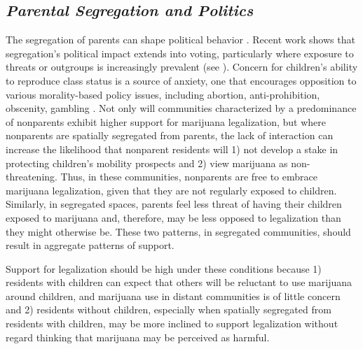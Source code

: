 
\subsection{\it{Parental Segregation and Politics}}

The segregation of parents can shape political behavior \citep{beisel_1997}. Recent work shows that segregation's political impact extends into voting, particularly where exposure to threats or outgroups is increasingly prevalent (see \citealt{andrews_and_seguin_2015}). Concern for children's ability to reproduce class status is a source of anxiety, one that encourages opposition to various morality-based policy issues, including abortion, anti-prohibition, obscenity, gambling \citep{owens_2016,schnabel_and_sevell_2017,luker_1984,gusfield_1963,beisel_1997}. Not only will communities characterized by a predominance of nonparents exhibit higher support for marijuana legalization, but where nonparents are spatially segregated from parents, the lack of interaction can increase the likelihood that nonparent residents will 1) not develop a stake in protecting children's mobility prospects and 2) view marijuana as non-threatening. Thus, in these communities, nonparents are free to embrace marijuana legalization, given that they are not regularly exposed to children. Similarly, in segregated spaces, parents feel less threat of having their children exposed to marijuana and, therefore, may be less opposed to legalization than they might otherwise be. These two patterns, in segregated communities, should result in aggregate patterns of support.





Support for legalization should be high under these conditions because 1) residents with children can expect that others will be reluctant to use marijuana around children, and marijuana use in distant communities is of little concern and 2) residents without children, especially when spatially segregated from residents with children, may be more inclined to support legalization without regard thinking that marijuana may be perceived as harmful.


